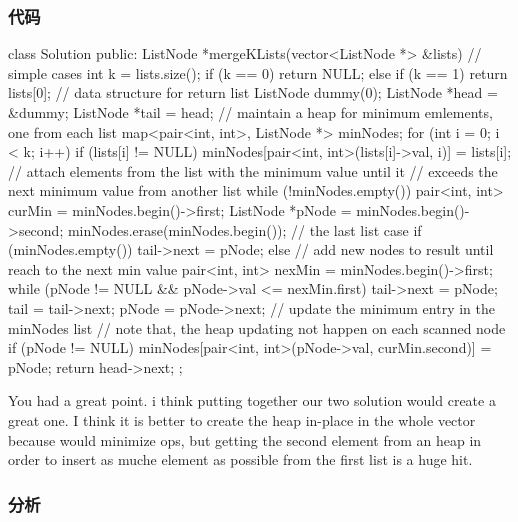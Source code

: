 \subsubsection{代码}
\begin{Code}
class Solution {
public:
    ListNode *mergeKLists(vector<ListNode *> &lists) {
        // simple cases
        int k = lists.size();
        if (k == 0)
            return NULL;
        else if (k == 1)
            return lists[0];
        // data structure for return list
        ListNode dummy(0);
        ListNode *head = &dummy;
        ListNode *tail = head;
        // maintain a heap for minimum emlements, one from each list
        map<pair<int, int>, ListNode *> minNodes;
        for (int i = 0; i < k; i++) {
            if (lists[i] != NULL)
                minNodes[pair<int, int>(lists[i]->val, i)] = lists[i];
        }
        // attach elements from the list with the minimum value until it
        // exceeds the next minimum value from another list
        while (!minNodes.empty()) {
            pair<int, int> curMin = minNodes.begin()->first;
            ListNode *pNode = minNodes.begin()->second;
            minNodes.erase(minNodes.begin());
            // the last list case
            if (minNodes.empty()) {
                tail->next = pNode;
            } else {
                // add new nodes to result until reach to the next min value
                pair<int, int> nexMin = minNodes.begin()->first;
                while (pNode != NULL && pNode->val <= nexMin.first) {
                    tail->next = pNode;
                    tail = tail->next;
                    pNode = pNode->next;
                }
                // update the minimum entry in the minNodes list
                // note that, the heap updating not happen on each scanned node
                if (pNode != NULL)
                    minNodes[pair<int, int>(pNode->val, curMin.second)] = pNode;
            }
        }
        return head->next;
    }
};
\end{Code}

You had a great point. i think putting together our two solution would create a great one. I think it is better to create the heap in-place in the whole vector because would minimize ops, but getting the second element from an heap in order to insert as muche element as possible from the first list is a huge hit.

\subsubsection{分析}

